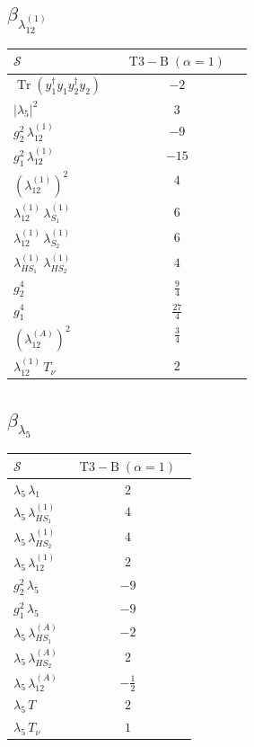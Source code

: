 \documentclass[9pt]{article}
\begin{document}
\subsection*{$ \beta_{\lambda_{12}^{(1)}} $}
\begin{longtable}{@{}p{0.31\linewidth}c@{}}
\toprule
$\mathcal{S}$ & $ \mathrm{T3-B}\;(\alpha=1) $ \\
\midrule
$ \operatorname{Tr}(y_1^\dagger y_1y_2^\dagger y_2) $ & $ -2 $ \\
$ |\lambda_5|^2 $ & $ 3 $ \\
$ g_2^2\,\lambda_{12}^{(1)} $ & $ -9 $ \\
$ g_1^2\,\lambda_{12}^{(1)} $ & $ -15 $ \\
$ \left(\lambda_{12}^{(1)}\right)^2 $ & $ 4 $ \\
$ \lambda_{12}^{(1)}\,\lambda_{S_1}^{(1)} $ & $ 6 $ \\
$ \lambda_{12}^{(1)}\,\lambda_{S_2}^{(1)} $ & $ 6 $ \\
$ \lambda_{HS_1}^{(1)}\,\lambda_{HS_2}^{(1)} $ & $ 4 $ \\
$ g_2^4 $ & $ \frac{9}{4} $ \\
$ g_1^4 $ & $ \frac{27}{4} $ \\
$ \left(\lambda_{12}^{(A)}\right)^2 $ & $ \frac{3}{4} $ \\
$ \lambda_{12}^{(1)}\,T_\nu $ & $ 2 $ \\
\bottomrule
\end{longtable}
\subsection*{$ \beta_{\lambda_5} $}
\begin{longtable}{@{}p{0.31\linewidth}c@{}}
\toprule
$\mathcal{S}$ & $ \mathrm{T3-B}\;(\alpha=1) $ \\
\midrule
$ \lambda_5\,\lambda_1 $ & $ 2 $ \\
$ \lambda_5\,\lambda_{HS_1}^{(1)} $ & $ 4 $ \\
$ \lambda_5\,\lambda_{HS_2}^{(1)} $ & $ 4 $ \\
$ \lambda_5\,\lambda_{12}^{(1)} $ & $ 2 $ \\
$ g_2^2\,\lambda_5 $ & $ -9 $ \\
$ g_1^2\,\lambda_5 $ & $ -9 $ \\
$ \lambda_5\,\lambda_{HS_1}^{(A)} $ & $ -2 $ \\
$ \lambda_5\,\lambda_{HS_2}^{(A)} $ & $ 2 $ \\
$ \lambda_5\,\lambda_{12}^{(A)} $ & $ - \frac{1}{2} $ \\
$ \lambda_5\,T $ & $ 2 $ \\
$ \lambda_5\,T_\nu $ & $ 1 $ \\
\bottomrule
\end{longtable}
\end{document}
